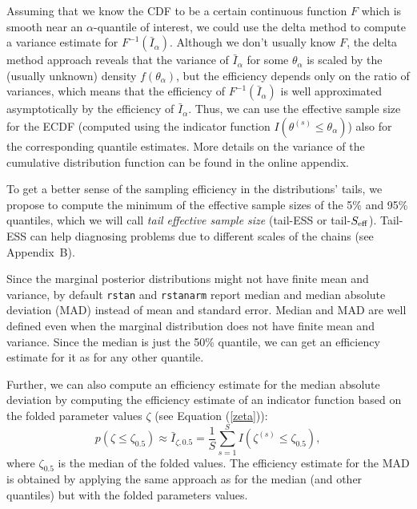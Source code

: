\documentclass[american,]{article}
\theoremstyle{definition}
\begin{document}
Assuming that we know the CDF to be a certain continuous function \(F\)
which is smooth near an \(\alpha\)-quantile of interest, we could use
the delta method to compute a variance estimate for
\(F^{-1}(\bar{I}_\alpha)\). Although we don't usually know \(F\), the
delta method approach reveals that the variance of \(\bar{I}_\alpha\)
for some \(\theta_\alpha\) is scaled by the (usually unknown) density
\(f(\theta_\alpha)\), but the efficiency depends only on the ratio of variances, which means that the efficiency of \(F^{-1}(\bar{I}_\alpha)\) is well approximated asymptotically by the  efficiency
of \(\bar{I}_\alpha\). Thus, we can use the effective sample size for
the ECDF (computed using the indicator function
\(I(\theta^{(s)} \leq \theta_\alpha)\)) also for the corresponding
quantile estimates. More details on the variance of the cumulative
distribution function can be found in the online appendix.

To get a better sense of the sampling efficiency in the
distributions' tails, we propose to compute the minimum of the effective
sample sizes of the 5\% and 95\% quantiles, which we will call
\emph{tail effective sample size} (tail-ESS or tail-\(S_{\rm eff}\)).
Tail-ESS can help diagnosing problems due to different scales of the
chains (see Appendix~B).


% 

Since the marginal posterior distributions might not have finite mean
and variance, by default \texttt{rstan} \citep{RStan.2.17} and \texttt{rstanarm}
\citep{RStanARM.2.17} report median and median absolute deviation (MAD)
instead of mean and standard error. Median and MAD are well defined
even when the marginal distribution does not have finite mean and
variance. Since the median is just the 50\% quantile, we can get an
efficiency estimate for it as for any other quantile.

Further, we can also compute an efficiency estimate for the median
absolute deviation by computing the efficiency estimate of an
indicator function based on the folded parameter values \(\zeta\) (see
Equation (\ref{zeta})):
\begin{equation}
p(\zeta \leq \zeta_{0.5}) \approx \bar{I}_{\zeta,0.5} = \frac{1}{S}\sum_{s=1}^S
I(\zeta^{(s)} \leq \zeta_{0.5}),
\end{equation}
where \(\zeta_{0.5}\) is the median of the folded values. The efficiency estimate for the MAD is obtained by applying the same
approach as for the median (and other quantiles) but with the folded
parameters values.
\end{document}
